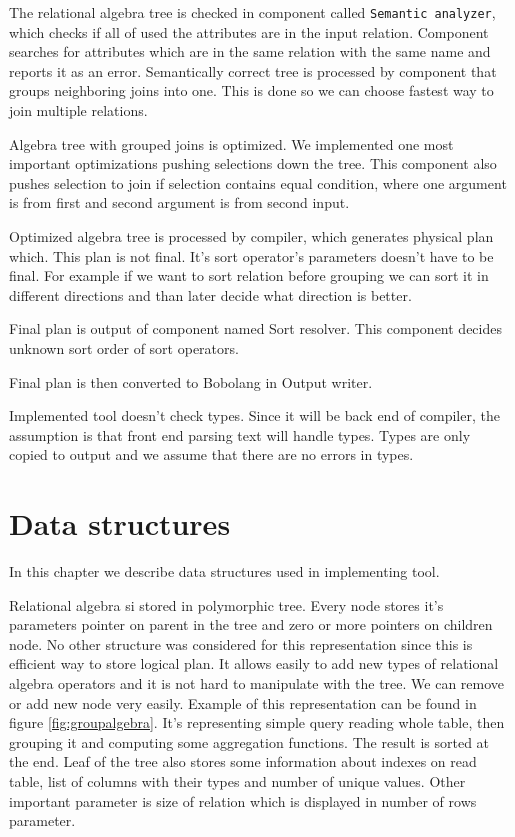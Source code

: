 The relational algebra tree is checked in component called \texttt{Semantic analyzer}, which checks if all of used the attributes are in the input relation. Component searches for attributes which are in the same relation with the same name and reports it as an error.
Semantically correct tree is processed by component that groups neighboring joins into one. This is done so we can choose fastest way to join multiple relations.

Algebra tree with grouped joins is optimized. We implemented one most important optimizations pushing selections down the tree. This component also pushes selection to join if selection contains equal condition, where one argument is from first and second argument is from second input.

Optimized algebra tree is processed by compiler, which generates physical plan which. This plan is not final. It's sort operator's parameters doesn't have to be final. For example if we want to sort relation before grouping we can sort it in different directions and than later decide what direction is better.

Final plan is output of component named Sort resolver. This component decides unknown sort order of sort operators.

Final plan is then converted to Bobolang in Output writer.

Implemented tool doesn't check types. Since it will be back end of compiler, the assumption is that front end parsing text will handle types. Types are only copied to output and we assume that there are no errors in types.

\section{Data structures}

In this chapter we describe data structures used in implementing tool.

Relational algebra si stored in polymorphic tree. Every node stores it's parameters pointer on parent in the tree and zero or more pointers on children node. No other structure was considered for this representation since this is efficient way to store logical plan. It allows easily to add new types of relational algebra operators and it is not hard to manipulate with the tree. We can remove or add new node very easily. 
Example of this representation can be found in figure \ref{fig:groupalgebra}. It's representing simple query reading whole table, then grouping it and computing some aggregation functions. The result is sorted at the end. Leaf of the tree also stores some information about indexes on read table, list of columns with their types and number of unique values. Other important parameter is size of relation which is displayed in number of rows parameter.

